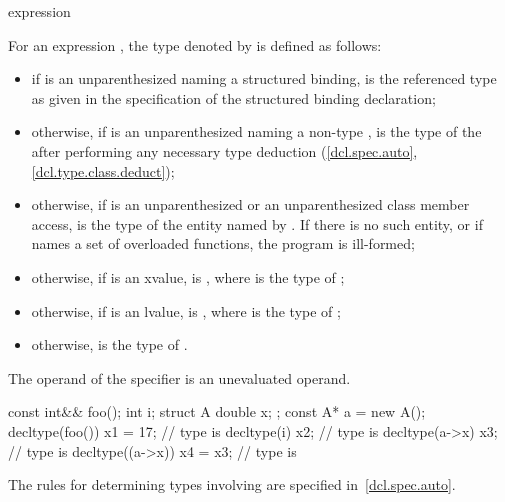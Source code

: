 \begin{bnf}
\br
   \terminal{(} expression \terminal{)}
\end{bnf}

\pnum
{}%
For an expression , the type denoted by  is defined as follows:
\begin{itemize}
\item if  is an unparenthesized 
naming a structured binding,
 is the referenced type as given in
the specification of the structured binding declaration;

\item otherwise, if  is an unparenthesized 
naming a non-type ,
 is the type of the 
after performing any necessary type deduction
(\ref{dcl.spec.auto}, \ref{dcl.type.class.deduct});

\item otherwise, if  is an unparenthesized  or
an unparenthesized
class
member access,  is the
type of the entity named by . If there is no such entity, or
if  names a set of overloaded functions, the program is
ill-formed;

\item otherwise, if  is
an xvalue,  is , where  is the type
of ;

\item otherwise, if  is an lvalue, 
is , where  is the type of ;

\item otherwise,  is the type of .
\end{itemize}

The operand of the  specifier is an unevaluated
operand.

\begin{example}
\begin{codeblock}
const int&& foo();
int i;
struct A { double x; };
const A* a = new A();
decltype(foo()) x1 = 17;        // type is 
decltype(i) x2;                 // type is 
decltype(a->x) x3;              // type is 
decltype((a->x)) x4 = x3;       // type is 
\end{codeblock}
\end{example}
\begin{note}
The rules for determining types involving  are specified
in~\ref{dcl.spec.auto}.
\end{note}

